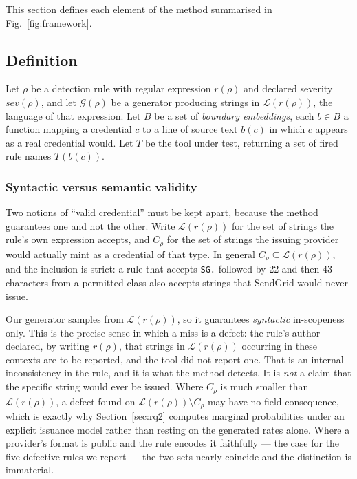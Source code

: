 \documentclass[journal]{IEEEtran}
\begin{document}
This section defines each element of the method summarised in Fig.~\ref{fig:framework}.


\subsection{Definition}

Let $\rho$ be a detection rule with regular expression $r(\rho)$ and declared severity $sev(\rho)$, and let $\mathcal{G}(\rho)$ be a generator producing strings in $\mathcal{L}(r(\rho))$, the language of that expression. Let $B$ be a set of \emph{boundary embeddings}, each $b \in B$ a function mapping a credential $c$ to a line of source text $b(c)$ in which $c$ appears as a real credential would. Let $T$ be the tool under test, returning a set of fired rule names $T(b(c))$.

\subsubsection*{Syntactic versus semantic validity}
\label{sec:validity}

Two notions of ``valid credential'' must be kept apart, because the method guarantees one and not the other. Write $\mathcal{L}(r(\rho))$ for the set of strings the rule's own expression accepts, and $C_\rho$ for the set of strings the issuing provider would actually mint as a credential of that type. In general $C_\rho \subseteq \mathcal{L}(r(\rho))$, and the inclusion is strict: a rule that accepts \texttt{SG.} followed by 22 and then 43 characters from a permitted class also accepts strings that SendGrid would never issue.

Our generator samples from $\mathcal{L}(r(\rho))$, so it guarantees \emph{syntactic} in-scope\-ness only. This is the precise sense in which a miss is a defect: the rule's author declared, by writing $r(\rho)$, that strings in $\mathcal{L}(r(\rho))$ occurring in these contexts are to be reported, and the tool did not report one. That is an internal inconsistency in the rule, and it is what the method detects. It is \emph{not} a claim that the specific string would ever be issued. Where $C_\rho$ is much smaller than $\mathcal{L}(r(\rho))$, a defect found on $\mathcal{L}(r(\rho)) \setminus C_\rho$ may have no field consequence, which is exactly why Section~\ref{sec:rq2} computes marginal probabilities under an explicit issuance model rather than resting on the generated rates alone. Where a provider's format is public and the rule encodes it faithfully --- the case for the five defective rules we report --- the two sets nearly coincide and the distinction is immaterial.
\end{document}
